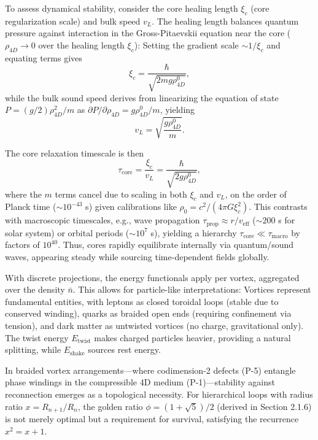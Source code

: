 To assess dynamical stability, consider the core healing length $\xi_c$ (core regularization scale) and bulk speed $v_L$. The healing length balances quantum pressure against interaction in the Gross-Pitaevskii equation near the core ($\rho_{4D} \to 0$ over the healing length $\xi_c$): Setting the gradient scale $\sim 1/\xi_c$ and equating terms gives
\begin{equation}
\xi_c = \frac{\hbar}{\sqrt{2 m g \rho_{4D}^0}},
\end{equation}
while the bulk sound speed derives from linearizing the equation of state $P = (g/2) \rho_{4D}^2 / m$ as $\partial P / \partial \rho_{4D} = g \rho_{4D}^0 / m$, yielding
\begin{equation}
v_L = \sqrt{\frac{g \rho_{4D}^0}{m}}.
\end{equation}

The core relaxation timescale is then
\begin{equation}
\tau_{\text{core}} = \frac{\xi_c}{v_L} = \frac{\hbar}{\sqrt{2 g \rho_{4D}^0}},
\end{equation}
where the $m$ terms cancel due to scaling in both $\xi_c$ and $v_L$, on the order of Planck time ($\sim 10^{-43}$ s) given calibrations like $\rho_0 = c^2 / (4\pi G \xi_c^2)$. This contrasts with macroscopic timescales, e.g., wave propagation $\tau_{\text{prop}} \approx r / v_{\text{eff}}$ ($\sim 200$ s for solar system) or orbital periods ($\sim 10^7$ s), yielding a hierarchy $\tau_{\text{core}} \ll \tau_{\text{macro}}$ by factors of $10^{40}$. Thus, cores rapidly equilibrate internally via quantum/sound waves, appearing steady while sourcing time-dependent fields globally.

With discrete projections, the energy functionals apply per vortex, aggregated over the density $\bar{n}$. This allows for particle-like interpretations: Vortices represent fundamental entities, with leptons as closed toroidal loops (stable due to conserved winding), quarks as braided open ends (requiring confinement via tension), and dark matter as untwisted vortices (no charge, gravitational only). The twist energy $E_{\text{twist}}$ makes charged particles heavier, providing a natural splitting, while $E_{\text{shake}}$ sources rest energy.

In braided vortex arrangements---where codimension-2 defects (P-5) entangle phase windings in the compressible 4D medium (P-1)---stability against reconnection emerges as a topological necessity. For hierarchical loops with radius ratio $x = R_{n+1}/R_n$, the golden ratio $\phi = (1 + \sqrt{5})/2$ (derived in Section 2.1.6) is not merely optimal but a requirement for survival, satisfying the recurrence $x^2 = x + 1$.

